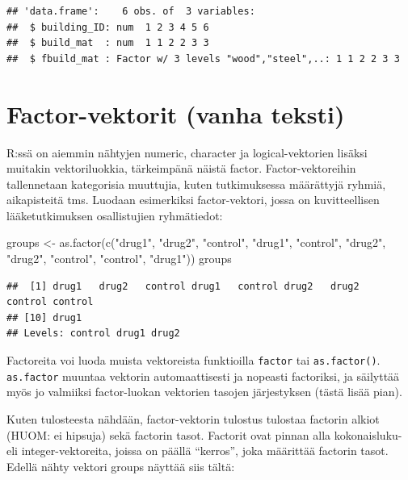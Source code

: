 \documentclass[
]{book}
\newenvironment{Shaded}{\begin{snugshade}}{\end{snugshade}}
\newcommand{\FunctionTok}[1]{\textcolor[rgb]{0.00,0.00,0.00}{#1}}
\newcommand{\NormalTok}[1]{#1}
\newcommand{\OtherTok}[1]{\textcolor[rgb]{0.56,0.35,0.01}{#1}}
\newcommand{\StringTok}[1]{\textcolor[rgb]{0.31,0.60,0.02}{#1}}
\begin{document}
\begin{verbatim}
## 'data.frame':    6 obs. of  3 variables:
##  $ building_ID: num  1 2 3 4 5 6
##  $ build_mat  : num  1 1 2 2 3 3
##  $ fbuild_mat : Factor w/ 3 levels "wood","steel",..: 1 1 2 2 3 3
\end{verbatim}

\hypertarget{factor-vektorit-vanha-teksti}{%
\section{Factor-vektorit (vanha teksti)}\label{factor-vektorit-vanha-teksti}}

R:ssä on aiemmin nähtyjen numeric, character ja logical-vektorien lisäksi muitakin vektoriluokkia, tärkeimpänä näistä factor. Factor-vektoreihin tallennetaan kategorisia muuttujia, kuten tutkimuksessa määrättyjä ryhmiä, aikapisteitä tms. Luodaan esimerkiksi factor-vektori, jossa on kuvitteellisen lääketutkimuksen osallistujien ryhmätiedot:

\begin{Shaded}
\begin{Highlighting}[]
\NormalTok{groups }\OtherTok{\textless{}{-}} \FunctionTok{as.factor}\NormalTok{(}\FunctionTok{c}\NormalTok{(}\StringTok{"drug1"}\NormalTok{, }\StringTok{"drug2"}\NormalTok{, }\StringTok{"control"}\NormalTok{, }\StringTok{"drug1"}\NormalTok{, }\StringTok{"control"}\NormalTok{,}
                      \StringTok{"drug2"}\NormalTok{, }\StringTok{"drug2"}\NormalTok{, }\StringTok{"control"}\NormalTok{, }\StringTok{"control"}\NormalTok{, }\StringTok{"drug1"}\NormalTok{))}
\NormalTok{groups}
\end{Highlighting}
\end{Shaded}

\begin{verbatim}
##  [1] drug1   drug2   control drug1   control drug2   drug2   control control
## [10] drug1  
## Levels: control drug1 drug2
\end{verbatim}

Factoreita voi luoda muista vektoreista funktioilla \texttt{factor} tai \texttt{as.factor()}. \texttt{as.factor} muuntaa vektorin automaattisesti ja nopeasti factoriksi, ja säilyttää myös jo valmiiksi factor-luokan vektorien tasojen järjestyksen (tästä lisää pian).

Kuten tulosteesta nähdään, factor-vektorin tulostus tulostaa factorin alkiot (HUOM: ei hipsuja) sekä factorin tasot. Factorit ovat pinnan alla kokonaisluku- eli integer-vektoreita, joissa on päällä ``kerros'', joka määrittää factorin tasot. Edellä nähty vektori groups näyttää siis tältä:
\end{document}

